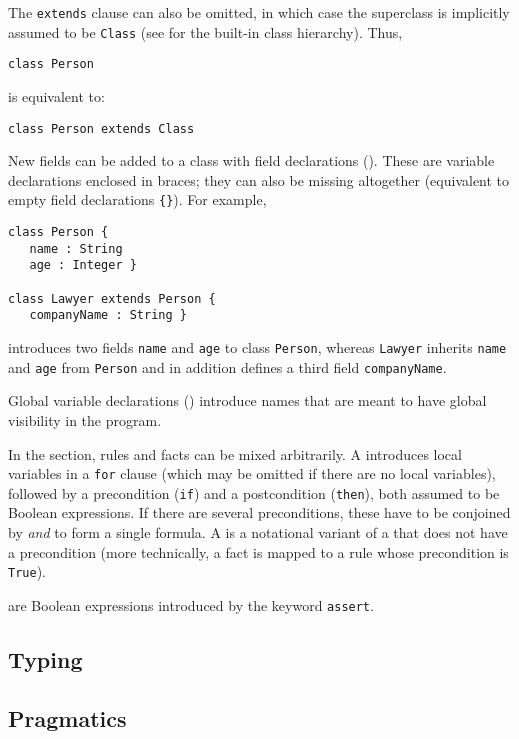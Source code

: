 The \texttt{extends} clause can also be omitted, in which case the superclass
is implicitly assumed to be \texttt{Class} (see  for the
built-in class hierarchy). Thus,
\begin{lstlisting}
class Person
\end{lstlisting}  
is equivalent to:
\begin{lstlisting}
class Person extends Class
\end{lstlisting}

New fields can be added to a class with field declarations
(). These are variable declarations
enclosed in braces; they can also be missing altogether (equivalent to empty
field declarations \texttt{\{\}}). For example, 
\begin{lstlisting}
class Person {
   name : String
   age : Integer }

class Lawyer extends Person {
   companyName : String }
\end{lstlisting}  
introduces two fields \texttt{name} and \texttt{age} to class \texttt{Person},
whereas \texttt{Lawyer} inherits \texttt{name} and \texttt{age} from
\texttt{Person} and in addition defines a third field \texttt{companyName}.

Global variable declarations () introduce names
that are meant to have global visibility in the program.

In the  section, rules and facts can be mixed
arbitrarily. A  introduces local variables in a
\texttt{for} clause (which may be omitted if there are no local variables),
followed by a precondition (\texttt{if}) and a postcondition (\texttt{then}),
both assumed to be Boolean expressions. If there are several preconditions,
these have to be conjoined by \emph{and} to form a single formula. 
A  is a notational variant of a  
that does not have a precondition (more technically, a fact is mapped to a
rule whose precondition is \texttt{True}).

 are Boolean expressions introduced by the keyword \texttt{assert}.


\subsection{Typing}\label{sec:typing}



\subsection{Pragmatics}\label{sec:pragmatics}



